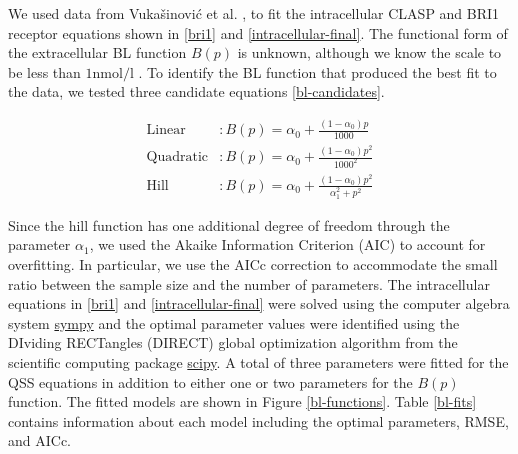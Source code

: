 \documentclass[referee,pdflatex,sn-mathphys-num]{sn-jnl}
\newcommand{\nm}{\unit{\nano\mole\per\litre}}
\begin{document}
We used data from Vukašinović et al. \cite{vukasinovic2021}, to fit the intracellular CLASP and BRI1 receptor equations shown in \eqref{bri1} and \eqref{intracellular-final}. The functional form of the extracellular BL function $B(p)$ is unknown, although we know the scale to be less than $1\nm$  \cite{vanesse2012}. To identify the BL function that produced the best fit to the data, we tested three candidate equations \eqref{bl-candidates}.

\begin{equation}
\label{bl-candidates}
\begin{aligned}
  \text{Linear}&: B(p) = \alpha_{0} + \frac{(1 - \alpha_{0})p}{1000} \\[5pt]
  \text{Quadratic}&: B(p) = \alpha_{0} + \frac{(1 - \alpha_{0})p^{2}}{1000^{2}} \\[5pt]
  \text{Hill}&: B(p) = \alpha_{0} + \frac{(1 - \alpha_{0})p^{2}}{\alpha_{1}^{2} + p^{2}}
\end{aligned}
\end{equation}

Since the hill function has one additional degree of freedom through the parameter $\alpha_{1}$, we used the Akaike Information Criterion (AIC) \cite{akaike1974} to account for overfitting. In particular, we use the AICc correction \cite{sugiura1978} to accommodate the small ratio between the sample size and the number of parameters. The intracellular equations in \eqref{bri1} and \eqref{intracellular-final} were solved using the computer algebra system \href{https://www.sympy.org/en/index.html}{sympy} and the optimal parameter values were identified using the DIviding RECTangles (DIRECT) global optimization algorithm \cite{jones1993} from the scientific computing package \href{https://docs.scipy.org/doc/scipy/reference/generated/scipy.optimize.direct.html}{scipy}. A total of three parameters were fitted for the QSS equations in addition to either one or two parameters for the $B(p)$ function. The fitted models are shown in Figure \ref{bl-functions}. Table \ref{bl-fits} contains information about each model including the optimal parameters, RMSE, and AICc.
\end{document}
